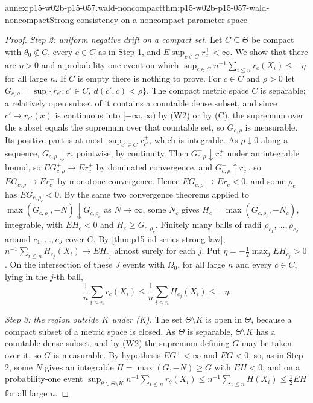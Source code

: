 \begin{annexitem}{annex:p15-w02b-p15-057.wald-noncompact}{thm:p15-w02b-p15-057-wald-noncompact}{Strong consistency on a noncompact parameter space}
\begin{proof}
\emph{Step 2: uniform negative drift on a compact set.} Let
\(C\subseteq\overline\Theta\) be compact with \(\theta_0\notin C\), every
\(c\in C\) as in Step 1, and \(E\sup_{c\in C}r_c^+<\infty\). We show that
there are \(\eta>0\) and a probability-one event on which
\(\sup_{c\in C}n^{-1}\sum_{i\leq n}r_c(X_i)\leq-\eta\) for all large \(n\).
If \(C\) is empty there is nothing to prove. For \(c\in C\) and
\(\rho>0\) let \(G_{c,\rho}=\sup\{r_{c'}:c'\in C,\ d(c',c)<\rho\}\). The
compact metric space \(C\) is separable; a relatively open subset of it
contains a countable dense subset, and since \(c'\mapsto r_{c'}(x)\) is
continuous into \([-\infty,\infty)\) by (W2) or by (C), the supremum over
the subset equals the supremum over that countable set, so \(G_{c,\rho}\)
is measurable. Its positive part is at most
\(\sup_{c'\in C}r_{c'}^+\), which is integrable. As \(\rho\downarrow0\)
along a sequence, \(G_{c,\rho}\downarrow r_c\) pointwise, by continuity.
Then \(G_{c,\rho}^+\downarrow r_c^+\) under an integrable bound, so
\(EG_{c,\rho}^+\to Er_c^+\) by dominated convergence, and
\(G_{c,\rho}^-\uparrow r_c^-\), so \(EG_{c,\rho}^-\to Er_c^-\) by monotone
convergence. Hence \(EG_{c,\rho}\to Er_c<0\), and some \(\rho_c\) has
\(EG_{c,\rho_c}<0\). By the same two convergence theorems applied to
\(\max(G_{c,\rho_c},-N)\downarrow G_{c,\rho_c}\) as \(N\to\infty\), some
\(N_c\) gives \(H_c=\max(G_{c,\rho_c},-N_c)\), integrable, with
\(EH_c<0\) and \(H_c\geq G_{c,\rho_c}\). Finitely many balls of radii
\(\rho_{c_1},\ldots,\rho_{c_J}\) around \(c_1,\ldots,c_J\) cover \(C\). By
\cref{thm:p15-iid-series-strong-law},
\(n^{-1}\sum_{i\leq n}H_{c_j}(X_i)\to EH_{c_j}\) almost surely for each
\(j\). Put \(\eta=-\tfrac12\max_jEH_{c_j}>0\). On the intersection of these
\(J\) events with \(\Omega_0\), for all large \(n\) and every \(c\in C\),
lying in the \(j\)-th ball,
\[
 \frac1n\sum_{i\leq n}r_c(X_i)\leq\frac1n\sum_{i\leq n}H_{c_j}(X_i)
 \leq-\eta .
\]

\emph{Step 3: the region outside \(K\) under (K).} The set
\(\Theta\setminus K\) is open in \(\Theta\), because a compact subset of a
metric space is closed. As \(\Theta\) is separable, \(\Theta\setminus K\)
has a countable dense subset, and by (W2) the supremum defining \(G\) may
be taken over it, so \(G\) is measurable. By hypothesis \(EG^+<\infty\) and
\(EG<0\), so, as in Step 2, some \(N\) gives an integrable
\(H=\max(G,-N)\geq G\) with \(EH<0\), and on a probability-one event
\(\sup_{\theta\in\Theta\setminus K}n^{-1}\sum_{i\leq n}r_\theta(X_i)\leq
n^{-1}\sum_{i\leq n}H(X_i)\leq\tfrac12EH\) for all large \(n\).


\end{proof}
\end{annexitem}
